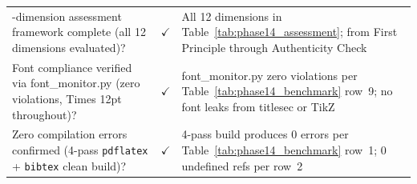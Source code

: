 \begin{xltabular}{\textwidth}{@{} X c X @{}}
-dimension assessment framework complete (all 12 dimensions evaluated)?                                           & $\checkmark$ & All 12 dimensions in Table~\ref{tab:phase14_assessment}; from First Principle through Authenticity Check \\
\addlinespace
Font compliance verified via font\_monitor.py (zero violations, Times 12pt throughout)?                             & $\checkmark$ & font\_monitor.py zero violations per Table~\ref{tab:phase14_benchmark} row~9; no font leaks from titlesec or TikZ \\
\addlinespace
Zero compilation errors confirmed (4-pass \texttt{pdflatex} + \texttt{bibtex} clean build)?                        & $\checkmark$ & 4-pass build produces 0 errors per Table~\ref{tab:phase14_benchmark} row~1; 0 undefined refs per row~2 \\
\end{xltabular}
\endgroup

\clearpage
